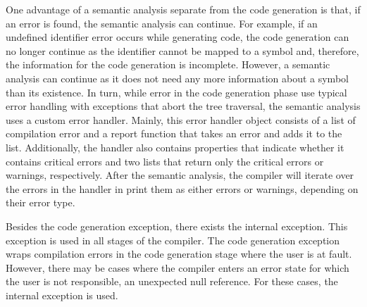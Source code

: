 One advantage of a semantic analysis separate from the code generation is that, if an error is found, the semantic analysis can continue. For example, if an undefined identifier error occurs while generating code, the code generation can no longer continue as the identifier cannot be mapped to a symbol and, therefore, the information for the code generation is incomplete. However, a semantic analysis can continue as it does not need any more information about a symbol than its existence. In turn, while error in the code generation phase use typical error handling with exceptions that abort the tree traversal, the semantic analysis uses a custom error handler. Mainly, this error handler object consists of a list of compilation error and a report function that takes an error and adds it to the list. Additionally, the handler also contains properties that indicate whether it contains critical errors and two lists that return only the critical errors or warnings, respectively. After the semantic analysis, the compiler will iterate over the errors in the handler in print them as either errors or warnings, depending on their error type.

Besides the code generation exception, there exists the internal exception. This exception is used in all stages of the compiler. The code generation exception wraps compilation errors in the code generation stage where the user is at fault. However, there may be cases where the compiler enters an error state for which the user is not responsible, \eg an unexpected null reference. For these cases, the internal exception is used.